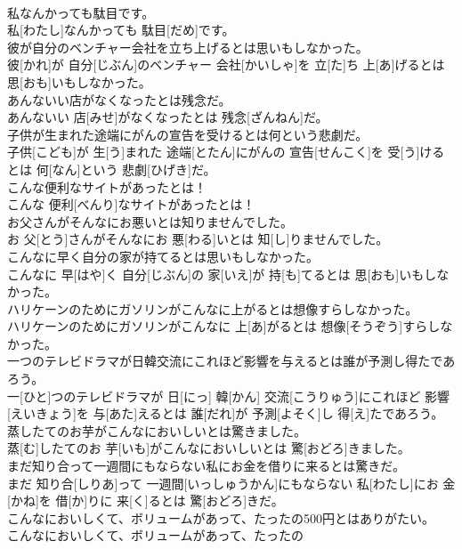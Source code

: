 \documentclass[8pt]{extreport}
\begin{document}
\begin{CJK}{UTF8}{min}
\\	私なんかっても駄目です。	
\\	私[わたし]なんかっても 駄目[だめ]です。
\\	彼が自分のベンチャー会社を立ち上げるとは思いもしなかった。	
\\	彼[かれ]が 自分[じぶん]のベンチャー 会社[かいしゃ]を 立[た]ち 上[あ]げるとは 思[おも]いもしなかった。
\\	あんないい店がなくなったとは残念だ。	
\\	あんないい 店[みせ]がなくなったとは 残念[ざんねん]だ。
\\	子供が生まれた途端にがんの宣告を受けるとは何という悲劇だ。	
\\	子供[こども]が 生[う]まれた 途端[とたん]にがんの 宣告[せんこく]を 受[う]けるとは 何[なん]という 悲劇[ひげき]だ。
\\	こんな便利なサイトがあったとは！	
\\	こんな 便利[べんり]なサイトがあったとは！
\\	お父さんがそんなにお悪いとは知りませんでした。	
\\	お 父[とう]さんがそんなにお 悪[わる]いとは 知[し]りませんでした。
\\	こんなに早く自分の家が持てるとは思いもしなかった。	
\\	こんなに 早[はや]く 自分[じぶん]の 家[いえ]が 持[も]てるとは 思[おも]いもしなかった。
\\	ハリケーンのためにガソリンがこんなに上がるとは想像すらしなかった。	
\\	ハリケーンのためにガソリンがこんなに 上[あ]がるとは 想像[そうぞう]すらしなかった。
\\	一つのテレビドラマが日韓交流にこれほど影響を与えるとは誰が予測し得たであろう。	
\\	一[ひと]つのテレビドラマが 日[にっ] 韓[かん] 交流[こうりゅう]にこれほど 影響[えいきょう]を 与[あた]えるとは 誰[だれ]が 予測[よそく]し 得[え]たであろう。
\\	蒸したてのお芋がこんなにおいしいとは驚きました。	
\\	蒸[む]したてのお 芋[いも]がこんなにおいしいとは 驚[おどろ]きました。
\\	まだ知り合って一週間にもならない私にお金を借りに来るとは驚きだ。	
\\	まだ 知り合[しりあ]って 一週間[いっしゅうかん]にもならない 私[わたし]にお 金[かね]を 借[か]りに 来[く]るとは 驚[おどろ]きだ。
\\	こんなにおいしくて、ボリュームがあって、たったの500円とはありがたい。	
\\	こんなにおいしくて、ボリュームがあって、たったの 

\end{CJK}
\end{document}
